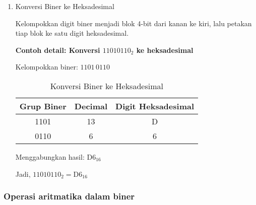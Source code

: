 \documentclass[../main.tex]{subfiles}
\begin{document}
\begin{enumerate}
                \item{Konversi Biner ke Heksadesimal}

                    Kelompokkan digit biner menjadi blok 4-bit dari kanan ke kiri, lalu petakan tiap blok ke satu digit heksadesimal.

                    \textbf{Contoh detail: Konversi \(11010110_2\) ke heksadesimal}

                    Kelompokkan biner: \(1101\,0110\)

                    \begin{table}[H]
                        \centering
                        \caption{Konversi Biner ke Heksadesimal}
                        \begin{tabular}{|c|c|c|}
                            \hline
                            \textbf{Grup Biner} & \textbf{Decimal} & \textbf{Digit Heksadesimal} \\
                            \hline
                            1101 & 13 & D \\
                            0110 & 6 & 6 \\
                            \hline
                        \end{tabular}
                        \label{tab:binary-to-hex}
                    \end{table}

                    Menggabungkan hasil: \(\mathrm{D6}_{16}\)

                    Jadi, \(11010110_2 = \mathrm{D6}_{16}\)

            \end{enumerate}

        \subsubsection{Operasi aritmatika dalam biner}
\end{document}
